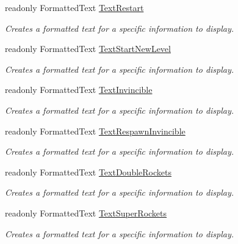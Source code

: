 \begin{DoxyCompactItemize}
readonly Formatted\+Text \mbox{\hyperlink{class_o_e_invaders_1_1_library_1_1_text_storage_aa5c827a2ff0c747d7327c6b02993dd9b}{Text\+Restart}}
\begin{DoxyCompactList}\small\item\em Creates a formatted text for a specific information to display. \end{DoxyCompactList}\item 
readonly Formatted\+Text \mbox{\hyperlink{class_o_e_invaders_1_1_library_1_1_text_storage_ab2e71aba1716d2b5b2c50c4236fb911f}{Text\+Start\+New\+Level}}
\begin{DoxyCompactList}\small\item\em Creates a formatted text for a specific information to display. \end{DoxyCompactList}\item 
readonly Formatted\+Text \mbox{\hyperlink{class_o_e_invaders_1_1_library_1_1_text_storage_a06d77673ef367ecf91c9b879e19e2c4c}{Text\+Invincible}}
\begin{DoxyCompactList}\small\item\em Creates a formatted text for a specific information to display. \end{DoxyCompactList}\item 
readonly Formatted\+Text \mbox{\hyperlink{class_o_e_invaders_1_1_library_1_1_text_storage_ac7ca8b9fbcad73159f80a8b7b8d4f9c5}{Text\+Respawn\+Invincible}}
\begin{DoxyCompactList}\small\item\em Creates a formatted text for a specific information to display. \end{DoxyCompactList}\item 
readonly Formatted\+Text \mbox{\hyperlink{class_o_e_invaders_1_1_library_1_1_text_storage_ab716c7cb40cb584d5aacaec629053ed1}{Text\+Double\+Rockets}}
\begin{DoxyCompactList}\small\item\em Creates a formatted text for a specific information to display. \end{DoxyCompactList}\item 
readonly Formatted\+Text \mbox{\hyperlink{class_o_e_invaders_1_1_library_1_1_text_storage_a682b437d948b2b54a6d2bff02368d904}{Text\+Super\+Rockets}}
\begin{DoxyCompactList}\small\item\em Creates a formatted text for a specific information to display. \end{DoxyCompactList}\item 

\end{DoxyCompactItemize}
